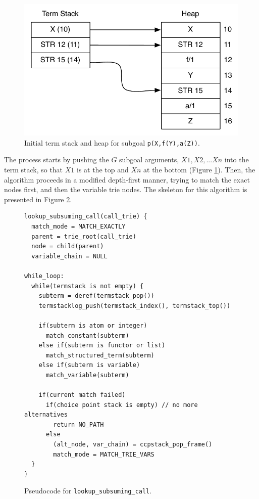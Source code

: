 \begin{figure}[ht]
  \centering
    \includegraphics[scale=0.6]{lookup_subgoal_termstack_start.pdf}
  \caption{Initial term stack and heap for subgoal \texttt{p(X,f(Y),a(Z))}.}
  \label{fig:lookup_subgoal_termstack_start}
\end{figure}

The process starts by pushing the $G$ subgoal arguments, $X1, X2, ...Xn$ into the term stack, so that $X1$ is at the top
and $Xn$ at the bottom (Figure \ref{fig:lookup_subgoal_termstack_start}).
Then, the algorithm proceeds in a modified depth-first manner, trying to match the exact nodes first, and then
the variable trie nodes. The skeleton for this algorithm is presented in Figure \ref{fig:lookup_subsuming_call}.

\begin{figure}[ht]
\begin{verbatim}
lookup_subsuming_call(call_trie) {
  match_mode = MATCH_EXACTLY
  parent = trie_root(call_trie)
  node = child(parent)
  variable_chain = NULL

while_loop:
  while(termstack is not empty) {
    subterm = deref(termstack_pop())
    termstacklog_push(termstack_index(), termstack_top())
  
    if(subterm is atom or integer)
      match_constant(subterm)
    else if(subterm is functor or list)
      match_structured_term(subterm)
    else if(subterm is variable)
      match_variable(subterm)
  
    if(current match failed)
      if(choice point stack is empty) // no more alternatives
        return NO_PATH
      else
        (alt_node, var_chain) = ccpstack_pop_frame()
        match_mode = MATCH_TRIE_VARS
  }
}
\end{verbatim}
\caption{Pseudo\-code for \texttt{lookup\_subsuming\_call}.}
\label{fig:lookup_subsuming_call}
\end{figure}

